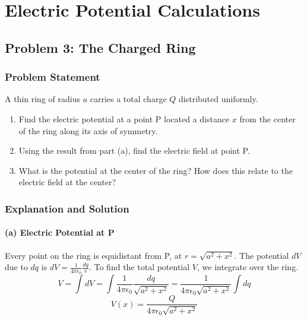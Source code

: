 \documentclass{article}
\begin{document}
\newpage
\section{Electric Potential Calculations}

\subsection{Problem 3: The Charged Ring}
\subsubsection*{Problem Statement}
A thin ring of radius $a$ carries a total charge $Q$ distributed uniformly.
\begin{enumerate}
    \item[(a)] Find the electric potential at a point P located a distance $x$ from the center of the ring along its axis of symmetry.
    \item[(b)] Using the result from part (a), find the electric field at point P.
    \item[(c)] What is the potential at the center of the ring? How does this relate to the electric field at the center?
\end{enumerate}

\begin{center}
\end{center}

\subsubsection*{Explanation and Solution}
\paragraph{(a) Electric Potential at P}
Every point on the ring is equidistant from P, at $r = \sqrt{a^2 + x^2}$.
The potential $dV$ due to $dq$ is $dV = \frac{1}{4\pi\epsilon_0} \frac{dq}{r}$. To find the total potential $V$, we integrate over the ring.
$$ V = \int dV = \int \frac{1}{4\pi\epsilon_0} \frac{dq}{\sqrt{a^2 + x^2}} = \frac{1}{4\pi\epsilon_0\sqrt{a^2 + x^2}} \int dq $$
$$ V(x) = \frac{Q}{4\pi\epsilon_0\sqrt{a^2 + x^2}} $$
\end{document}

